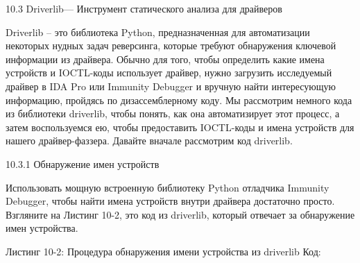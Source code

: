 \documentclass[12pt]{book}
\begin{document}
10.3 Driverlib— Инструмент статического анализа для драйверов

Driverlib – это библиотека Python, предназначенная для автоматизации некоторых нудных задач реверсинга, которые требуют обнаружения ключевой информации из драйвера. Обычно для того, чтобы определить какие имена устройств и IOCTL-коды использует драйвер, нужно загрузить исследуемый драйвер в IDA Pro или Immunity Debugger и вручную найти интересующую информацию, пройдясь по дизассемблерному коду. Мы рассмотрим немного кода из библиотеки driverlib, чтобы понять, как она автоматизирует этот процесс, а затем воспользуемся ею, чтобы предоставить IOCTL-коды и имена устройств для нашего драйвер-фаззера. Давайте вначале рассмотрим код driverlib.

10.3.1 Обнаружение имен устройств

Использовать мощную встроенную библиотеку Python отладчика Immunity Debugger, чтобы найти имена устройств внутри драйвера достаточно просто. Взгляните на Листинг 10-2, это код из driverlib, который отвечает за обнаружение имен устройства.

Листинг 10-2: Процедура обнаружения имени устройства из driverlib
Код:





\end{document}
